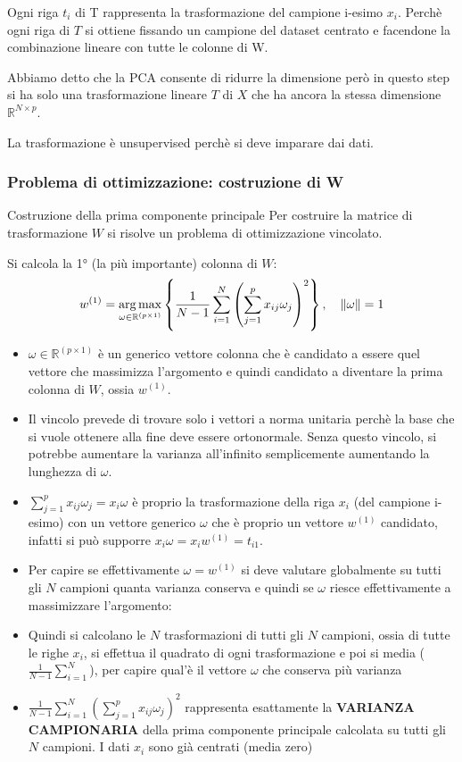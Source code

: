 	Ogni riga $t_i$ di T rappresenta la trasformazione del campione i-esimo $x_i$. Perchè ogni riga di $T$ si ottiene fissando un campione del dataset centrato e facendone la combinazione lineare con tutte le colonne di W.
	
	Abbiamo detto che la PCA consente di ridurre la dimensione però in questo step si ha solo una trasformazione lineare $T$ di $X$ che ha ancora la stessa dimensione $\mathbb{R}^{N\times p}$.
	
	La trasformazione è unsupervised perchè si deve imparare dai dati.
	
	\subsubsection{Problema di ottimizzazione: costruzione di W}
	\begin{mybox2}{Costruzione della prima componente principale}
		Per costruire la matrice di trasformazione $W$ si risolve un problema di ottimizzazione vincolato.\myvspace
		
		Si calcola la 1° (la più importante) colonna di $W$:
		$$
		w^{(1)} = \operatorname*{arg\,max}_{\omega\in \mathbb{R}^{(p\times1)}} \left\{ \frac{1}{N-1} \sum_{i=1}^{N} \left( \sum_{j=1}^{p} x_{ij} \omega_j \right)^2 \right\},\quad \|\omega\|=1
		$$
		
		\begin{itemize}[itemsep=3pt, topsep=3pt]
		  \item $\omega\in \mathbb{R}^{(p\times1)}$ è un generico vettore colonna che è candidato a essere quel vettore che massimizza l’argomento e quindi candidato a diventare la prima colonna di $W$, ossia $w^{(1)}$.
		  \item Il vincolo prevede di trovare solo i vettori a norma unitaria perchè la base che si vuole ottenere alla fine deve essere ortonormale. Senza questo vincolo, si potrebbe aumentare la varianza all'infinito semplicemente aumentando la lunghezza di $\omega$.
		  \item $\sum_{j=1}^{p} x_{ij}\omega_j = x_i\omega$ è proprio la trasformazione della riga $x_i$ (del campione i-esimo) con un vettore generico $\omega$ che è proprio un vettore $w^{(1)}$ candidato, infatti si può supporre $x_i\omega=x_iw^{(1)}=t_{i1}$.
		  \item Per capire se effettivamente $\omega=w^{(1)}$ si deve valutare globalmente su tutti gli $N$ campioni quanta varianza conserva e quindi se $\omega$ riesce effettivamente a massimizzare l’argomento:
		  \item Quindi si calcolano le $N$ trasformazioni di tutti gli $N$ campioni, ossia di tutte le righe $x_i$, si effettua il quadrato di ogni trasformazione e poi si media ($\frac{1}{N-1} \sum_{i=1}^{N}$), per capire qual’è il vettore $\omega$ che conserva più varianza
		  \item $\frac{1}{N-1} \sum_{i=1}^{N} (\sum_{j=1}^{p} x_{ij} \omega_j)^2$ rappresenta esattamente la \textbf{VARIANZA CAMPIONARIA} della prima componente principale calcolata su tutti gli $N$ campioni. I dati $x_i$ sono già centrati (media zero)
		\end{itemize}
		

\end{mybox2}
